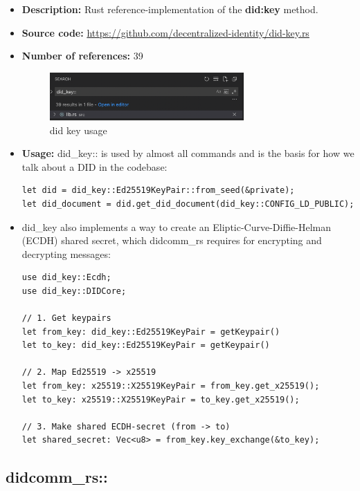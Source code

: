 \begin{itemize}
\item
  \textbf{Description:} Rust reference-implementation of the
  \textbf{did:key} method.
\item
  \textbf{Source code:}
  \url{https://github.com/decentralized-identity/did-key.rs}
\item
  \textbf{Number of references:} 39

  \begin{figure}
  \centering
  \includegraphics[width=0.7\textwidth]{Architecture 1442df162dbe45f4a423ba37d3e12363/Untitled 8.png}
  \caption{did key usage}
  \end{figure}
\item
  \textbf{Usage:} did\_key:: is used by almost all commands and is the
  basis for how we talk about a DID in the codebase:

\begin{lstlisting}
let did = did_key::Ed25519KeyPair::from_seed(&private);
let did_document = did.get_did_document(did_key::CONFIG_LD_PUBLIC);
\end{lstlisting}
\item
  did\_key also implements a way to create an
  Eliptic-Curve-Diffie-Helman (ECDH) shared secret, which didcomm\_rs
  requires for encrypting and decrypting messages:

\begin{lstlisting}
use did_key::Ecdh;
use did_key::DIDCore;

// 1. Get keypairs
let from_key: did_key::Ed25519KeyPair = getKeypair()
let to_key: did_key::Ed25519KeyPair = getKeypair()

// 2. Map Ed25519 -> x25519
let from_key: x25519::X25519KeyPair = from_key.get_x25519();
let to_key: x25519::X25519KeyPair = to_key.get_x25519();

// 3. Make shared ECDH-secret (from -> to)
let shared_secret: Vec<u8> = from_key.key_exchange(&to_key);
\end{lstlisting}
\end{itemize}

\hypertarget{didcomm_rs}{%
\subsection{didcomm\_rs::}\label{didcomm_rs}}

